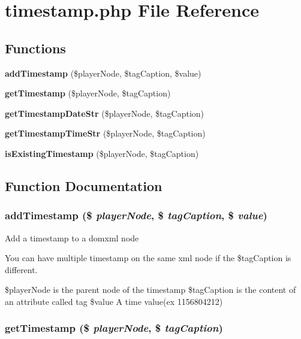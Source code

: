 \section{timestamp.php File Reference}
\label{timestamp_8php}


\subsection*{Functions}
\begin{CompactItemize}
\item 
{\bf add\-Timestamp} (\$player\-Node, \$tag\-Caption, \$value)
\item 
{\bf get\-Timestamp} (\$player\-Node, \$tag\-Caption)
\item 
{\bf get\-Timestamp\-Date\-Str} (\$player\-Node, \$tag\-Caption)
\item 
{\bf get\-Timestamp\-Time\-Str} (\$player\-Node, \$tag\-Caption)
\item 
{\bf is\-Existing\-Timestamp} (\$player\-Node, \$tag\-Caption)
\end{CompactItemize}


\subsection{Function Documentation}
\subsubsection{\setlength{\rightskip}{0pt plus 5cm}add\-Timestamp (\$ {\em player\-Node}, \$ {\em tag\-Caption}, \$ {\em value})}\label{timestamp_8php_4fdb48fb26d5887f63ff008179e28a18}


Add a timestamp to a domxml node

You can have multiple timestamp on the same xml node if the \$tag\-Caption is different.

\$player\-Node is the parent node of the timestamp \$tag\-Caption is the content of an attribute called tag \$value A time value(ex 1156804212) 
\subsubsection{\setlength{\rightskip}{0pt plus 5cm}get\-Timestamp (\$ {\em player\-Node}, \$ {\em tag\-Caption})}\label{timestamp_8php_63550e2a0fa42847c03e6366dab40cb6}


